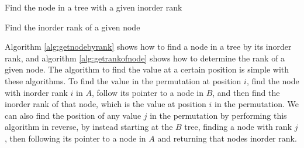 \begin{algorithm}[t]
  \SetAlgoLined\DontPrintSemicolon

  \vspace{0.5cm}
  \caption{Find the node in a tree with a given inorder rank}
  \label{alg:getnodebyrank}
\end{algorithm}

\begin{algorithm}[t]
  \SetAlgoLined\DontPrintSemicolon

  \vspace{0.5cm}
  \caption{Find the inorder rank of a given node}
  \label{alg:getrankofnode}
\end{algorithm}

Algorithm \ref{alg:getnodebyrank} shows how to find a node in a tree by its inorder rank,
and algorithm \ref{alg:getrankofnode} shows how to determine the rank of a given node. The
algorithm to find the value at a certain position is simple with these algorithms. To find
the value in the permutation at position $i$, find the node with inorder rank $i$ in $A$,
follow its pointer to a node in $B$, and then find the inorder rank of that node, which is
the value at position $i$ in the permutation. We can also find the position of any value
$j$ in the permutation by performing this algorithm in reverse, by instead starting at the
$B$ tree, finding a node with rank $j$, then following its pointer to a node in $A$ and
returning that nodes inorder rank.

